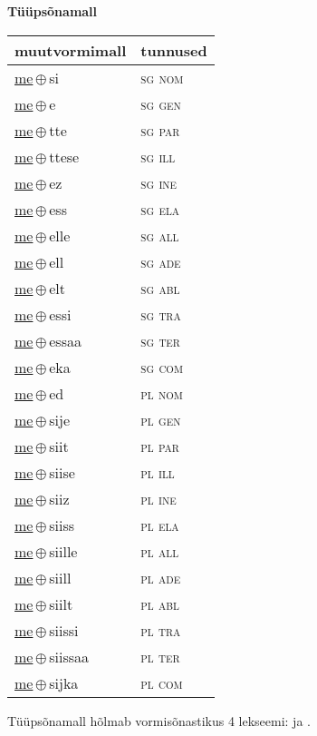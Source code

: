 

\vspace{3.5em}
\noindent \begin{minipage}{\textwidth}
\noindent \textbf{Tüüpsõnamall \,}\\

\begin{sideways}
\begin{tabular}{l l}
muutvormimall & tunnused \\
\hline
\underline{me}\,$\oplus$\,si & \textsc{ sg nom } \\
\underline{me}\,$\oplus$\,e & \textsc{ sg gen } \\
\underline{me}\,$\oplus$\,tte & \textsc{ sg par } \\
\underline{me}\,$\oplus$\,ttese & \textsc{ sg ill } \\
\underline{me}\,$\oplus$\,ez & \textsc{ sg ine } \\
\underline{me}\,$\oplus$\,ess & \textsc{ sg ela } \\
\underline{me}\,$\oplus$\,elle & \textsc{ sg all } \\
\underline{me}\,$\oplus$\,ell & \textsc{ sg ade } \\
\underline{me}\,$\oplus$\,elt & \textsc{ sg abl } \\
\underline{me}\,$\oplus$\,essi & \textsc{ sg tra } \\
\underline{me}\,$\oplus$\,essaa & \textsc{ sg ter } \\
\underline{me}\,$\oplus$\,eka & \textsc{ sg com } \\
\underline{me}\,$\oplus$\,ed & \textsc{ pl nom } \\
\underline{me}\,$\oplus$\,sije & \textsc{ pl gen } \\
\underline{me}\,$\oplus$\,siit & \textsc{ pl par } \\
\underline{me}\,$\oplus$\,siise & \textsc{ pl ill } \\
\underline{me}\,$\oplus$\,siiz & \textsc{ pl ine } \\
\underline{me}\,$\oplus$\,siiss & \textsc{ pl ela } \\
\underline{me}\,$\oplus$\,siille & \textsc{ pl all } \\
\underline{me}\,$\oplus$\,siill & \textsc{ pl ade } \\
\underline{me}\,$\oplus$\,siilt & \textsc{ pl abl } \\
\underline{me}\,$\oplus$\,siissi & \textsc{ pl tra } \\
\underline{me}\,$\oplus$\,siissaa & \textsc{ pl ter } \\
\underline{me}\,$\oplus$\,sijka & \textsc{ pl com } \\
\end{tabular}
\end{sideways}
\label{tab:tüüpsõnamall-mesi}

\end{minipage}

 
\vspace{1em}
\noindent Tüüpsõnamall  hõlmab vormisõnastikus 4 lekseemi:  ja .

